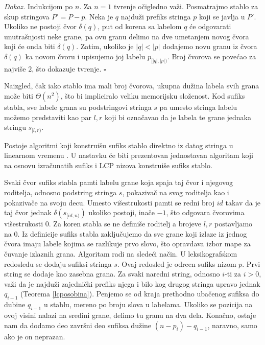 \textit{Dokaz.} Indukcijom po $n$. Za $n=1$ tvr\dj enje o\v cigledno va\v zi. Posmatrajmo stablo za skup stringova $P' = P - p$. Neka je $q$ najdu\v zi prefiks stringa $p$ koji se javlja u $P'$. Ukoliko ne postoji \v cvor $\delta(q)$, put od korena sa labelom $q$ \' ce odgovarati unutra\v snjosti neke grane, pa ovu granu delimo na dve umetanjem novog \v cvora koji \' ce onda biti $\delta(q)$. Zatim, ukoliko je $|q| < |p|$ dodajemo novu granu iz \v cvora $\delta(q)$ ka novom \v cvoru i upisujemo joj labelu $p_{[|q|, |p|)}$. Broj \v cvorova se pove\' cao za najvi\v se $2$, \v sto dokazuje tvr\dj enje. \hfill $\square$

Naizgled, \v cak iako stablo ima mali broj \v cvorova, ukupna du\v zina labela svih grana mo\v ze biti $\Theta(n^2)$, \v sto bi impliciralo veliku memorijsku slo\v zenost. Kod sufiks stabla, sve labele grana su podstringovi stringa $s$ pa umesto stringa labelu mo\v zemo predstaviti kao par $l,r$ koji bi ozna\v cavao da je labela te grane jednaka stringu $s_{[l, r)}$.

Postoje algoritmi koji konstrui\v su sufiks stablo direktno iz datog stringa u linearnom vremenu \cite{suffixtreerad}. U nastavku \' ce biti prezentovan jednostavan algoritam koji na osnovu izra\v cunatih sufiks i LCP nizova konstrui\v se sufiks stablo.

\noindent
\begin{minipage}[l]{\textwidth}

\end{minipage}

Svaki \v cvor sufiks stabla pamti labelu grane koja spaja taj \v cvor i njegovog roditelja, odnosno podstring stringa $s$, pokaziva\v c na svog roditelja kao i pokaziva\v ce na svoju decu. Umesto vi\v sestrukosti pamti se redni broj $id$ takav da je taj \v cvor jednak $\delta(s_{[id,n)})$ ukoliko postoji, ina\v ce $-1$, \v sto odgovara \v cvorovima vi\v sestrukosti $0$. Za koren stabla se ne defini\v se roditelj a brojeve $l,r$ postavljamo na $0$. Iz definicije sufiks stabla zaklju\v cujemo da sve grane koji izlaze iz jednog \v cvora imaju labele kojima se razlikuje prvo slovo, \v sto opravdava izbor mape za \v cuvanje izlaznih grana. Algoritam radi na slede\' ci na\v cin. U leksikografskom redosledu se dodaju sufiksi stringa $s$. Ovaj redosled je odre\dj en sufiks nizom $p$. Prvi string se dodaje kao zasebna grana. Za svaki naredni string, odnosno $i$-ti za $i>0$, va\v zi da je najdu\v zi zajedni\v cki prefiks njega i bilo kog drugog stringa upravo jednak $q_{i-1}$ (Teorema \ref{lcposobina}). Penjemo se od kraja prethodno uba\v cenog sufiksa do dubine $q_{i-1}$ u stablu, mereno po broju slova u labelama. Ukoliko se pozicija na ovoj visini nalazi na sredini grane, delimo tu granu na dva dela. Kona\v cno, ostaje nam da dodamo deo zavr\v sni deo sufiksa du\v zine $(n-p_i)-q_{i-1}$, naravno, samo ako je on neprazan.

